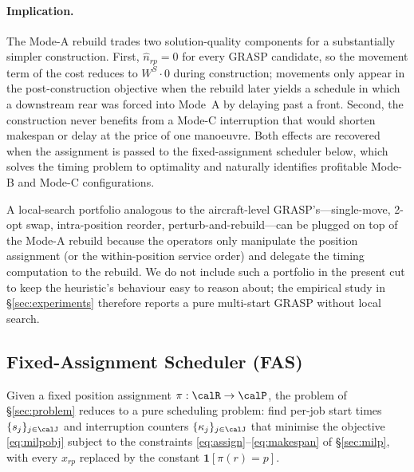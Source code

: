 \paragraph{Implication.}
The Mode-A rebuild trades two solution-quality components for a
substantially simpler construction.  First, $\hat n_{rp} = 0$ for every
GRASP candidate, so the movement term of the cost reduces to
$W^S \cdot 0$ during construction; movements only appear in the
post-construction objective when the rebuild later yields a schedule
in which a downstream rear was forced into Mode~A by delaying past a
front.  Second, the construction never benefits from a Mode-C
interruption that would shorten makespan or delay at the price of one
manoeuvre.  Both effects are recovered when the assignment is passed to
the fixed-assignment scheduler below, which solves the timing problem
to optimality and naturally identifies profitable Mode-B and Mode-C
configurations.

A local-search portfolio analogous to the aircraft-level
GRASP's---single-move, 2-opt swap, intra-position reorder,
perturb-and-rebuild---can be plugged on top of the Mode-A rebuild
because the operators only manipulate the position assignment (or the
within-position service order) and delegate the timing computation to
the rebuild.  We do not include such a portfolio in the present cut
to keep the heuristic's behaviour easy to reason about; the empirical
study in \S\ref{sec:experiments} therefore reports a pure
multi-start GRASP without local search.

\subsection{Fixed-Assignment Scheduler (FAS)}
\label{sec:fas}

Given a fixed position assignment $\pi : \calR \to \calP$, the problem
of \S\ref{sec:problem} reduces to a pure scheduling problem: find per-job
start times $\{s_j\}_{j \in \calJ}$ and interruption counters
$\{\kappa_j\}_{j \in \calJ}$ that minimise the objective
\eqref{eq:milpobj} subject to the constraints
\eqref{eq:assign}--\eqref{eq:makespan} of \S\ref{sec:milp}, with every
$x_{rp}$ replaced by the constant $\mathbf{1}[\pi(r) = p]$.

